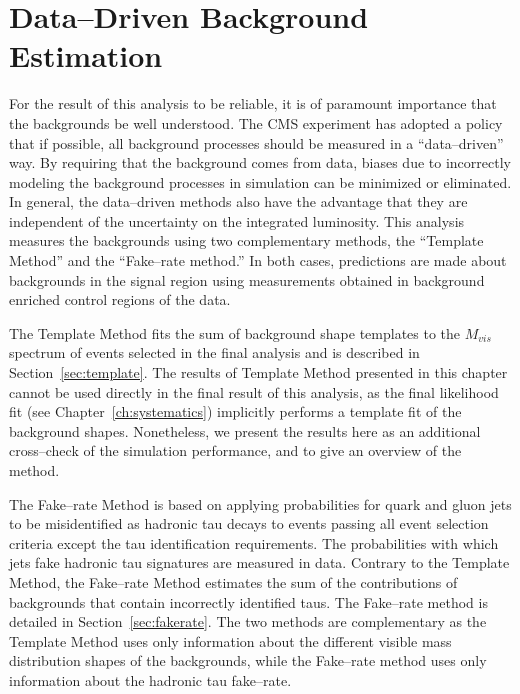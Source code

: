 \ifx\master\undefined\fi
\newcommand{\tablesize}{\small} \chapter{Data--Driven Background Estimation}
\label{ch:backgrounds}
%
For the result of this analysis to be reliable, it is of paramount importance
that the backgrounds be well understood.  The CMS experiment has adopted a
policy that if possible, all background processes should be measured in a
``data--driven'' way.  By requiring that the background comes from data, biases
due to incorrectly modeling the background processes in simulation can be
minimized or eliminated.  In general, the data--driven methods also have the
advantage that they are independent of the uncertainty on the integrated
luminosity.  This analysis measures the backgrounds using two complementary
methods, the ``Template Method'' and the ``Fake--rate method.'' In both cases,
predictions are made about backgrounds in the signal region using measurements
obtained in background enriched control regions of the data. 

The Template Method fits the sum of background shape templates  to the $M_{vis}$
spectrum of events selected in the final analysis and is described in
Section~\ref{sec:template}.  The results of Template Method presented in this
chapter cannot be used directly in the final result of this analysis, as the
final likelihood fit (see Chapter~\ref{ch:systematics}) implicitly performs a
template fit of the background shapes.  Nonetheless, we present the results here
as an additional cross--check of the simulation performance, and to give an
overview of the method.

The Fake--rate Method is based on applying probabilities for quark and gluon
jets to be misidentified as hadronic tau decays to events passing all event
selection criteria except the tau identification requirements.  The
probabilities with which jets fake hadronic tau signatures are measured in data.
Contrary to the Template Method, the Fake--rate Method estimates the sum of the
contributions of backgrounds that contain incorrectly identified taus.  The
Fake--rate method is detailed in Section~\ref{sec:fakerate}.  The two methods
are complementary as the Template Method uses only information about the
different visible mass distribution shapes of the backgrounds, while the
Fake--rate method uses only information about the hadronic tau fake--rate.

